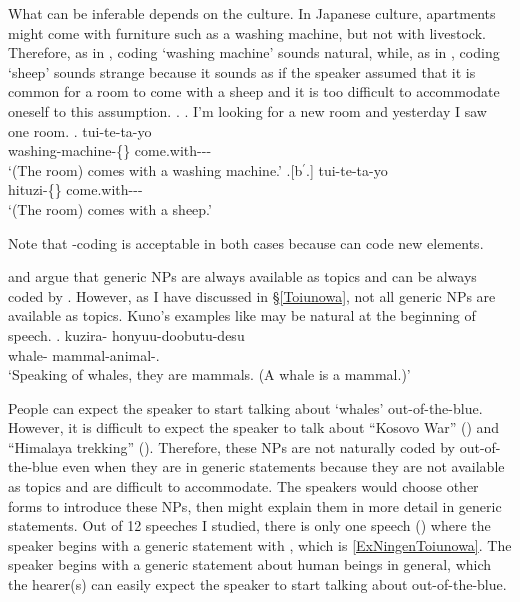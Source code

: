 What can be inferable depends on the culture.
In Japanese culture,
apartments might come with furniture such as a washing machine,
but not with livestock.
Therefore, as in \Next[b],
 coding  `washing machine' sounds natural,
while, as in \Next[b$^{\prime}$],
 coding  `sheep' sounds strange
because it sounds as if the speaker assumed that it is common for a room to come with a sheep
and it is too difficult to accommodate oneself to this assumption.
\ex.\label{ExSentakuki}
 \a. I'm looking for a new room and yesterday I saw one room.
 \bg.  tui-te-ta-yo \\
 	washing-machine-\{\} come.with--- \\
	`(The room) comes with a washing machine.'
 \bg.[b$^{\prime}$.]  tui-te-ta-yo \\
 	hituzi-\{\} come.with--- \\
	`(The room) comes with a sheep.'

Note that -coding is acceptable in both cases
because  can code new elements.

 and  argue that
generic NPs are always available as topics and
can be always coded by .
However, as I have discussed in \S \ref{Toiunowa},
not all generic NPs are available as topics.
Kuno's examples like \Next may be natural at the beginning of speech.
%
\exg. kuzira- honyuu-doobutu-desu \\
      whale- mammal-animal-. \\
      `Speaking of whales, they are mammals. (A whale is a mammal.)'
      \hfill{\cite[p.~44]{kuno73}}

People can expect the speaker to start talking about  `whales' out-of-the-blue.
However, it is difficult to expect the speaker to talk about
``Kosovo War'' () and ``Himalaya trekking'' ().
Therefore,
these NPs  are not naturally coded by  out-of-the-blue
even when they are in generic statements
because they are not available as topics and are difficult to accommodate.
The speakers would choose other forms to introduce these NPs,
then might explain them in more detail in generic statements.
Out of 12 speeches I studied,
there is only one speech () where the speaker begins with a generic statement with ,
which is \ref{ExNingenToiunowa}.
The speaker begins with a generic statement about human beings in general,
which the hearer(s) can easily expect the speaker to start talking about out-of-the-blue.

